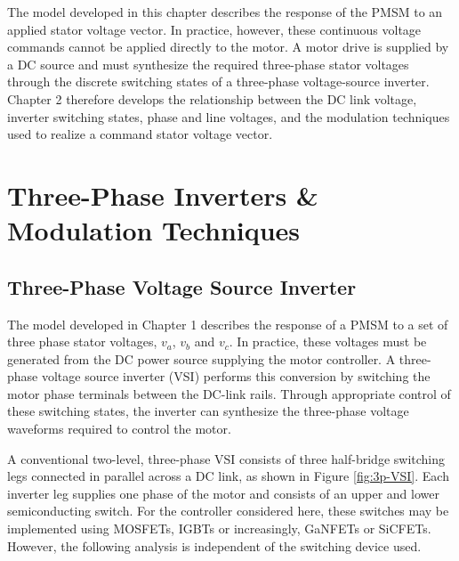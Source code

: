 \documentclass{article}
\begin{document}
The model developed in this chapter describes the response of the PMSM to an applied stator voltage vector. In practice, however, these continuous voltage commands cannot be applied directly to the motor. A motor drive is supplied by a DC source and must synthesize the required three-phase stator voltages through the discrete switching states of a three-phase voltage-source inverter. Chapter 2 therefore develops the relationship between the DC link voltage, inverter switching states, phase and line voltages, and the modulation techniques used to realize a command stator voltage vector. 


\pagebreak
\section{Three-Phase Inverters \& Modulation Techniques}
\label{sec:three-phase-interters-and-modulation-techniques}


\subsection{Three-Phase Voltage Source Inverter}
\label{sec:three-phase-voltage-source-inverter}

The model developed in Chapter 1 describes the response of a PMSM to a set of three phase stator voltages, $v_a$, $v_b$ and $v_c$. In practice, these voltages must be generated from the DC power source supplying the motor controller. A three-phase voltage source inverter (VSI) performs this conversion by switching the motor phase terminals between the DC-link rails. Through appropriate control of these switching states, the inverter can synthesize the three-phase voltage waveforms required to control the motor. 

A conventional two-level, three-phase VSI consists of three half-bridge switching legs connected in parallel across a DC link, as shown in Figure \ref{fig:3p-VSI}. Each inverter leg supplies one phase of the motor and consists of an upper and lower semiconducting switch. For the controller considered here, these switches may be implemented using MOSFETs, IGBTs or increasingly, GaNFETs or SiCFETs. However, the following analysis is independent of the switching device used.

\end{document}
